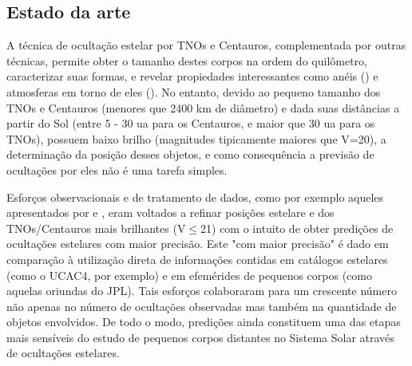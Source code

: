 \documentclass[a4paper, 11pt]{article}
\begin{document}
\subsection{Estado da arte}

A técnica de ocultação estelar por TNOs e Centauros, complementada por outras técnicas, permite obter o tamanho destes corpos na ordem do quilômetro, caracterizar suas formas, e revelar propiedades interessantes como anéis (\cite{2017Natur.550..219O, 2014AGUFM.P43F..01B}) e atmosferas em torno de eles (\cite{1538-3881-136-5-1757, 2006Natur.439...52S}). No entanto, devido ao pequeno tamanho dos TNOs e Centauros (menores que 2400 km de diâmetro) e dada suas dist\^ancias a partir do Sol (entre  5 - 30 ua para os Centauros, e maior que 30 ua para os TNOs), possuem baixo brilho (magnitudes tipicamente maiores que V=20), a determina\c c\~ao da posi\c c\~ao desses objetos, e como consequ\^encia a previsão de ocultações por eles não é uma tarefa simples. 
% 
% 
% 
 
 Esforços observacionais e de tratamento de dados, como por exemplo aqueles apresentados por \citet{2010A&A...515A..32A} e \citet{2014A&A...561A..37C}, eram voltados a refinar posições estelare e dos TNOs/Centauros mais brilhantes (V$\leq$21) com o intuito de obter predições de ocultações estelares com maior precisão. Este "com maior precisão"  é dado em comparação à utilização direta de informações contidas em catálogos estelares (como o UCAC4, por exemplo) e em efemérides de pequenos corpos (como aquelas oriundas do JPL). Tais esfor\c cos colaboraram para um crescente número não apenas no número de ocultações observadas mas também na quantidade de objetos envolvidos. De todo o modo, predições ainda constituem uma das etapas mais sensíveis do estudo de pequenos corpos distantes no Sistema Solar através de ocultações estelares. 
% 
% 
\end{document}
